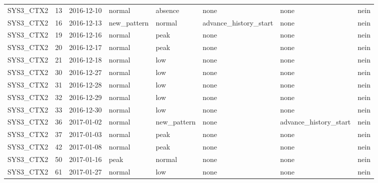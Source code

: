 \begin{tabular}{lrllllll}
SYS3\_CTX2 & 13 & 2016-12-10 & normal & absence & none & none & nein \\
SYS3\_CTX2 & 16 & 2016-12-13 & new\_pattern & normal & advance\_history\_start & none & nein \\
SYS3\_CTX2 & 19 & 2016-12-16 & normal & peak & none & none & nein \\
SYS3\_CTX2 & 20 & 2016-12-17 & normal & peak & none & none & nein \\
SYS3\_CTX2 & 21 & 2016-12-18 & normal & low & none & none & nein \\
SYS3\_CTX2 & 30 & 2016-12-27 & normal & low & none & none & nein \\
SYS3\_CTX2 & 31 & 2016-12-28 & normal & low & none & none & nein \\
SYS3\_CTX2 & 32 & 2016-12-29 & normal & low & none & none & nein \\
SYS3\_CTX2 & 33 & 2016-12-30 & normal & low & none & none & nein \\
SYS3\_CTX2 & 36 & 2017-01-02 & normal & new\_pattern & none & advance\_history\_start & nein \\
SYS3\_CTX2 & 37 & 2017-01-03 & normal & peak & none & none & nein \\
SYS3\_CTX2 & 42 & 2017-01-08 & normal & peak & none & none & nein \\
SYS3\_CTX2 & 50 & 2017-01-16 & peak & normal & none & none & nein \\
SYS3\_CTX2 & 61 & 2017-01-27 & normal & low & none & none & nein \\
\bottomrule
\end{tabular}
